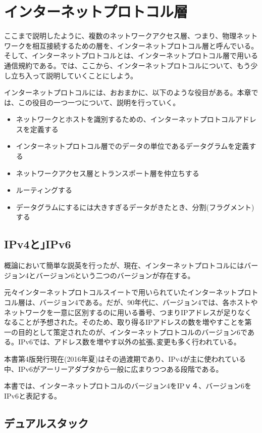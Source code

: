 \section{インターネットプロトコル層}

ここまで説明したように、複数のネットワークアクセス層、つまり、物理ネットワークを相互接続するための層を、インターネットプロトコル層と呼んでいる。そして、インターネットプロトコルとは、インターネットプロトコル層で用いる通信規約である。では、ここから、インターネットプロトコルについて、もう少し立ち入って説明していくことにしよう。

インターネットプロトコルには、おおまかに、以下のような役目がある。本章では、この役目の一つ一つについて、説明を行っていく。

\begin{itemize}
\item ネットワークとホストを識別するための、インターネットプロトコルアドレスを定義する 
\item インターネットプロトコル層でのデータの単位であるデータグラムを定義する 
\item ネットワークアクセス層とトランスポート層を仲立ちする 
\item ルーティングする
\item データグラムにするには大きすぎるデータがきたとき、分割(フラグメント)する
\end{itemize}

\subsection{IPv4と｣IPv6}
概論において簡単な説英を行ったが、現在、インターネットプロトコルにはバージョン4とバージョン6という二つのバージョンが存在する。

元々インターネットプロトコルスイートで用いられていたインターネットプロトコル層は、バージョン4である。だが、90年代に、バージョン4では、各ホストやネットワークを一意に区別するのに用いる番号、つまりIPアドレスが足りなくなることが予想された。そのため、取り得るIPアドレスの数を増やすことを第一の目的として策定されたのが、インターネットプロトコルのバージョン6である。IPv6では、アドレス数を増やす以外の拡張､変更も多く行われている。

本書第4版発行現在(2016年夏)はその過渡期であり、IPv4が主に使われている中、IPv6がアーリーアダプタから一般に広まりつつある段階である。

本書では、インターネットプロトコルのバージョン4をIPｖ４、バージョン6をIPv6と表記する。

\subsection{デュアルスタック}

